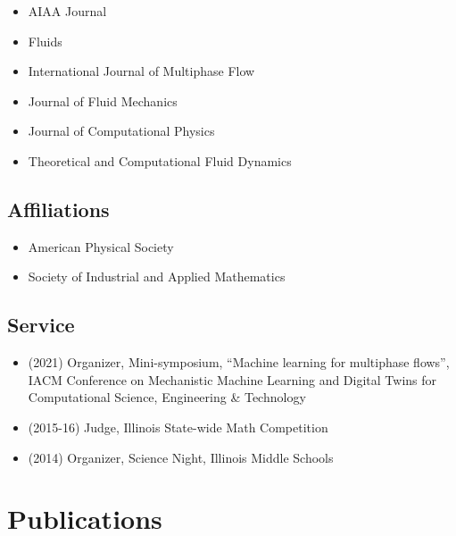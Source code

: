 \begin{itemize}
    \item AIAA Journal
    \item Fluids
    \item International Journal of Multiphase Flow
    \item Journal of Fluid Mechanics
    \item Journal of Computational Physics
    \item Theoretical and Computational Fluid Dynamics
\end{itemize}

\subsection{Affiliations}

\begin{itemize}
    \item American Physical Society
    \item Society of Industrial and Applied Mathematics
\end{itemize}

\subsection{Service}

\begin{itemize}
    \item (2021) Organizer, Mini-symposium, ``Machine learning for multiphase flows'', IACM Conference on Mechanistic Machine Learning and Digital Twins for Computational Science, Engineering \& Technology
    \item (2015-16) Judge, Illinois State-wide Math Competition
    \item (2014) Organizer, Science Night, Illinois Middle Schools
\end{itemize}


\section{Publications}

\nocite{*}

\newrefcontext[labelprefix=P]
\printbibliography[type=unpublished,title={Preprints},resetnumbers=true,heading=subbibnumbered]

\newrefcontext[labelprefix=J]
\printbibliography[type=article,title={Journal papers},resetnumbers=true,heading=subbibnumbered]

